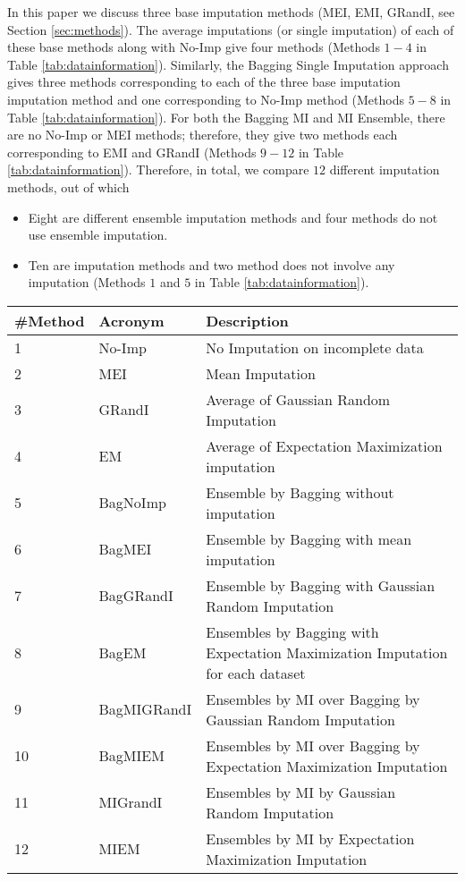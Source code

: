 \documentclass{iosart2c}
\begin{document}
In this paper we discuss three base imputation methods (MEI, EMI, GRandI, see Section \ref{sec:methods}). The average imputations (or single imputation) of each of these base methods along with No-Imp give four methods (Methods $1-4$ in Table \ref{tab:datainformation}). Similarly, the Bagging Single Imputation approach gives three methods corresponding to each of the three base imputation imputation method and one corresponding to No-Imp method (Methods $5-8$ in Table \ref{tab:datainformation}). For both the Bagging MI and MI Ensemble, there are no No-Imp or MEI methods; therefore, they give two methods each corresponding to EMI and GRandI (Methods $9-12$ in Table \ref{tab:datainformation}). Therefore, in total, we compare $12$ different imputation methods, out of which 
\begin{itemize}[label=\textbullet]
 \item Eight are different ensemble imputation methods and four methods do not use ensemble imputation.
 \item Ten are imputation methods and two method does not involve any imputation (Methods $1$ and $5$ in Table \ref{tab:datainformation}).
\end{itemize}


\begin{table*}
\centering
\caption{{Acronyms for different imputation methods and their descriptions.}}
\begin{tabular}{|p{1.5cm}|p{2.5cm}|p{10cm}|}
\hline
\textbf{\#Method} & \textbf{Acronym} & \textbf{Description} \\ \hline  
1&No-Imp & No Imputation on incomplete data
\\2&MEI & Mean Imputation
\\3&GRandI & Average of Gaussian Random Imputation
\\4&EM & Average of Expectation Maximization imputation 
\\ \hline 5&BagNoImp & Ensemble by Bagging without imputation
\\6&BagMEI & Ensemble by Bagging with mean imputation 
\\7&BagGRandI&Ensemble by Bagging with Gaussian Random Imputation 
\\8&BagEM&Ensembles by Bagging with Expectation Maximization Imputation for each dataset
\\9&BagMIGRandI&Ensembles by MI over Bagging by Gaussian Random Imputation
\\10&BagMIEM&Ensembles by MI over Bagging by Expectation Maximization Imputation
\\11&MIGrandI&Ensembles by  MI by Gaussian Random Imputation
\\12&MIEM&Ensembles by  MI by Expectation Maximization Imputation
\\
\hline
\end{tabular}
\label{tab:datainformation}
\end{table*}
\end{document}
